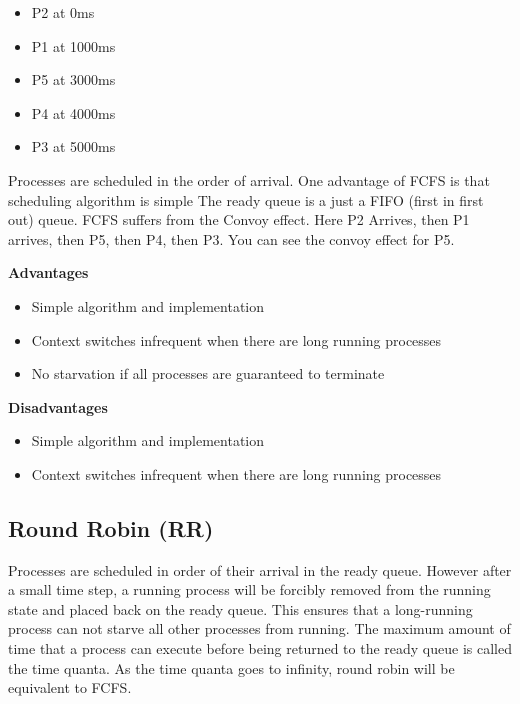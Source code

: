 \begin{itemize}
\tightlist
\item
  P2 at 0ms
\item
  P1 at 1000ms
\item
  P5 at 3000ms
\item
  P4 at 4000ms
\item
  P3 at 5000ms
\end{itemize}

Processes are scheduled in the order of arrival.
One advantage of FCFS is that scheduling algorithm is simple
The ready queue is a just a FIFO (first in first out) queue.
FCFS suffers from the Convoy effect.
Here P2 Arrives, then P1 arrives, then P5, then P4, then P3. You can see the convoy effect for P5.

\textbf{Advantages}

\begin{itemize}
\item Simple algorithm and implementation
\item Context switches infrequent when there are long running processes
\item No starvation if all processes are guaranteed to terminate
\end{itemize}

\textbf{Disadvantages}
\begin{itemize}
\item Simple algorithm and implementation
\item Context switches infrequent when there are long running processes

\end{itemize}

\subsection{Round Robin (RR)}

Processes are scheduled in order of their arrival in the ready queue.
However after a small time step, a running process will be forcibly removed from the running state and placed back on the ready queue.
This ensures that a long-running process can not starve all other processes from running.
The maximum amount of time that a process can execute before being returned to the ready queue is called the time quanta.
As the time quanta goes to infinity, round robin will be equivalent to FCFS.

